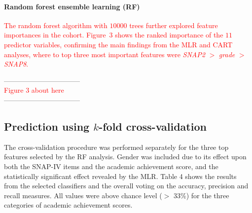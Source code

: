 \documentclass[10pt,letterpaper]{article}
\begin{document}
{{\paragraph{Random forest ensemble learning (RF)}
\textcolor{red}{The random forest algorithm with $10000$ trees further explored feature importances in the cohort. 
Figure~3 shows the ranked importance of the $11$ predictor variables, 
confirming the main findings from the MLR and CART analyses, where to top three most important features were {\it SNAP2}  $>$ {\it grade}  $>$  {\it SNAP8}.}  \\

\vspace{3mm}
 
\begin{center}
---------------------------------\\
 
\textcolor{red}{Figure 3 about here} \\
 
---------------------------------\\
\end{center}
  
\vspace{3mm}
  

\subsection*{Prediction using $k$-fold cross-validation}

The cross-validation procedure was performed separately for the three top features selected by the RF analysis. Gender was included due to its effect upon both the SNAP-IV items and the academic achievement score, and the statistically significant effect revealed by the MLR.  
Table 4 shows the results from the selected classifiers and the overall voting on the accuracy, precision and recall measures. All values were above chance level ($>$ 33\%) for the three categories of academic achievement scores. 



}}
\end{document}
